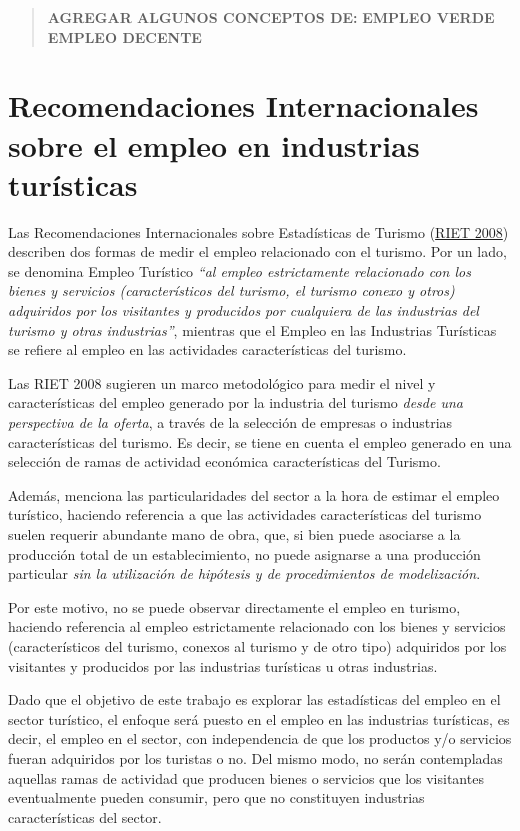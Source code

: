 \documentclass[
  openany]{book}
\begin{document}
\begin{quote}
\textbf{AGREGAR ALGUNOS CONCEPTOS DE:}
\textbf{EMPLEO VERDE }
\textbf{EMPLEO DECENTE}
\end{quote}

\hypertarget{recomendaciones-internacionales-sobre-el-empleo-en-industrias-turuxedsticas}{%
\section{Recomendaciones Internacionales sobre el empleo en industrias turísticas}\label{recomendaciones-internacionales-sobre-el-empleo-en-industrias-turuxedsticas}}

Las Recomendaciones Internacionales sobre Estadísticas de Turismo (\href{https://unstats.un.org/unsd/publication/seriesm/seriesm_83rev1s.pdf}{RIET 2008}) describen dos formas de medir el empleo relacionado con el turismo. Por un lado, se denomina Empleo Turístico \emph{``al empleo estrictamente relacionado con los bienes y servicios (característicos del turismo, el turismo conexo y otros) adquiridos por los visitantes y producidos por cualquiera de las industrias del turismo y otras industrias''}, mientras que el Empleo en las Industrias Turísticas se refiere al empleo en las actividades características del turismo.

Las RIET 2008 sugieren un marco metodológico para medir el nivel y características del empleo generado por la industria del turismo \emph{desde una perspectiva de la oferta}, a través de la selección de empresas o industrias características del turismo. Es decir, se tiene en cuenta el empleo generado en una selección de ramas de actividad económica características del Turismo.

Además, menciona las particularidades del sector a la hora de estimar el empleo turístico, haciendo referencia a que las actividades características del turismo suelen requerir abundante mano de obra, que, si bien puede asociarse a la producción total de un establecimiento, no puede asignarse a una producción particular \emph{sin la utilización de hipótesis y de procedimientos de modelización}.

Por este motivo, no se puede observar directamente el empleo en turismo, haciendo referencia al empleo estrictamente relacionado con los bienes y servicios (característicos del turismo, conexos al turismo y de otro tipo) adquiridos por los visitantes y producidos por las industrias turísticas u otras industrias.

Dado que el objetivo de este trabajo es explorar las estadísticas del empleo en el sector turístico, el enfoque será puesto en el empleo en las industrias turísticas, es decir, el empleo en el sector, con independencia de que los productos y/o servicios fueran adquiridos por los turistas o no. Del mismo modo, no serán contempladas aquellas ramas de actividad que producen bienes o servicios que los visitantes eventualmente pueden consumir, pero que no constituyen industrias características del sector.
\end{document}
